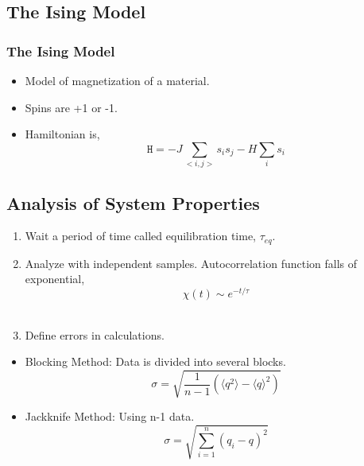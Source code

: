 \documentclass[10pt, notes]{beamer}
\begin{document}
\subsection{The Ising Model}
\begin{frame}
\frametitle{The Ising Model}
\begin{itemize}
\item Model of magnetization of a material. \\
\item Spins are +1 or -1. \\
\item Hamiltonian is,
\begin{equation}
\texttt{H} = - J \sum\limits_{<i,j>} s_i s_j - H\sum\limits_{i} s_i
\end{equation}
\end{itemize}
\end{frame}

\subsection{Analysis of System Properties}
\begin{frame}
\begin{enumerate}
\item Wait a period of time called equilibration time, $\tau_{eq}$. 
\item Analyze with independent samples.  
Autocorrelation function falls of exponential,
\begin{equation}
\chi (t) \sim e^{-t/ \tau}
\end{equation} \\
\item Define errors in calculations. 
\end{enumerate}
\begin{itemize}
\item Blocking Method: 
Data is divided into several blocks.
\begin{equation}
\sigma =  \sqrt{\frac{1}{n-1} (\langle q^2 \rangle - \langle q\rangle^2)}
\end{equation}
\item Jackknife Method: 
Using n-1 data. 
\begin{equation}
\sigma = \sqrt{\sum\limits_{i=1}^n (q_i - q )^2}
\end{equation}
\end{itemize}

\end{frame}
  
\end{document}
